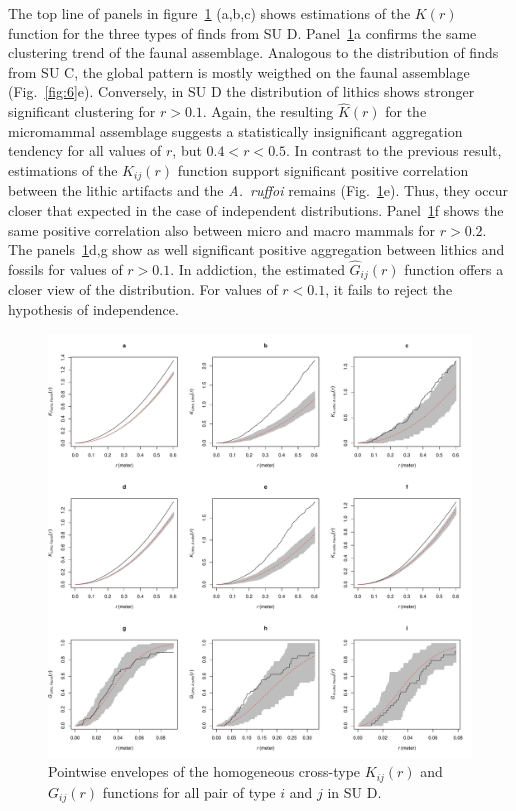 \documentclass[review,authoryear]{elsarticle} %
\begin{document}
The top line of panels in figure~\ref{fig:8} (a,b,c) shows estimations of the $K(r)$ function for the three types of finds from SU D. Panel~\ref{fig:8}a confirms the same clustering trend of the faunal assemblage. Analogous to the distribution of finds from SU C, the global pattern is mostly weigthed on the faunal assemblage (Fig.~\ref{fig:6}e). Conversely, in SU D the distribution of lithics shows stronger significant clustering for $r>0.1$. Again, the resulting $\hat{K}(r)$ for the micromammal assemblage suggests a statistically insignificant aggregation tendency for all values of $r$, but $0.4<r<0.5$. In contrast to the previous result, estimations of the $K_{ij}(r)$ function support significant positive correlation between the lithic artifacts and the \emph{A.~ruffoi} remains (Fig.~\ref{fig:8}e). Thus, they occur closer that expected in the case of independent distributions. Panel~\ref{fig:8}f shows the same positive correlation also between micro and macro mammals for $r>0.2$. The panels~\ref{fig:8}d,g show as well significant positive aggregation between lithics and fossils for values of $r>0.1$. In addiction, the estimated $\hat G_{ij}(r)$ function offers a closer view of the distribution. For values of $r<0.1$, it fails to reject the hypothesis of independence.

\begin{figure}
  \centering
  \includegraphics[width=1\textwidth]{../artwork/Fig8.pdf}
  \caption{Pointwise envelopes of the homogeneous cross-type $K_{ij}(r)$ and $G_{ij}(r)$ functions for all pair of type $i$ and $j$ in SU D.}
  \label{fig:8}
\end{figure}
\end{document}
